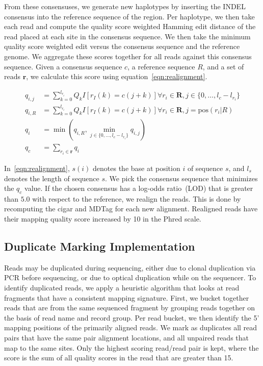 \documentclass[masters]{ucbthesis}
\begin{document}
From these consensuses, we generate new haplotypes by inserting the INDEL consensus into the reference
sequence of the region. Per haplotype, we then take each read and compute the quality score weighted Hamming
edit distance of the read placed at each site in the consensus sequence. We then take the minimum quality
score weighted edit versus the consensus sequence and the reference genome. We aggregate these scores
together for all reads against this consensus sequence. Given a consensus sequence $c$, a reference sequence $R$,
and a set of reads $\mathbf{r}$, we calculate this score using equation~\eqref{eqn:realignment}.

\begin{align}
\label{eqn:realignment}
q_{i, j} &= \sum_{k = 0}^{l_{r_i}} Q_k I[r_I(k) = c(j + k)] \forall r_i \in \mathbf{R}, j \in \{0, \dots, l_c - l_{r_i}\}  \\
q_{i, R} &= \sum_{k = 0}^{l_{r_i}} Q_k I[r_I(k) = c(j + k)] \forall r_i \in \mathbf{R}, j = \text{pos}(r_i | R) \\
q_i &= \min(q_{i, R}, \min_{j \in \{0, \dots, l_c - l_{r_i}\}} q_{i, j}) \\
q_c &= \sum_{r_i \in \mathbf{r}} q_i
\end{align}

In~\eqref{eqn:realignment}, $s(i)$ denotes the base at position $i$ of sequence $s$, and $l_s$ denotes the
length of sequence $s$. We pick the consensus sequence that minimizes the $q_c$ value. If the chosen
consensus has a log-odds ratio~(LOD) that is greater than $5.0$ with respect to the reference, we realign the
reads. This is done by recomputing the cigar and MDTag for each new alignment. Realigned reads have their
mapping quality score increased by 10 in the Phred scale.

\subsection{Duplicate Marking Implementation}
\label{sec:duplicate-marking-implementation}

Reads may be duplicated during sequencing, either due to clonal duplication via PCR before sequencing, or
due to optical duplication while on the sequencer. To identify duplicated reads, we apply a heuristic algorithm
that looks at read fragments that have a consistent mapping signature. First, we bucket together reads that
are from the same sequenced fragment by grouping reads together on the basis of read name and record group.
Per read bucket, we then identify the 5' mapping positions of the primarily aligned reads.
We mark as duplicates all read pairs that have the same pair alignment locations, and all unpaired reads that
map to the same sites. Only the highest scoring read/read pair is kept, where the score is the sum of all quality
scores in the read that are greater than 15.
\end{document}
